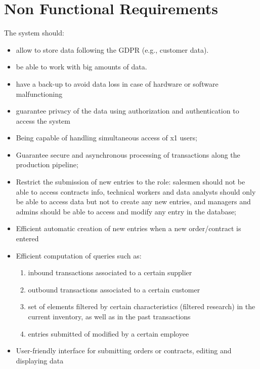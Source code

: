 \section{Non Functional Requirements}
The system should:
\begin{itemize}
    \item allow to store data following the GDPR (e.g., customer data).
    \item be able to work with big amounts of data.
    \item have a back-up to avoid data loss in case of hardware or software malfunctioning
    \item guarantee privacy of the data using authorization and authentication to access the system
    \item Being capable of handling simultaneous access of x1 users;
    \item Guarantee secure and asynchronous processing of transactions along the production pipeline;
    \item Restrict the submission of new entries to the role: salesmen should not be able to access contracts info, technical workers and data analysts should only be able to access data but not to create any new entries, and managers and admins should be able to access and modify any entry in the database;
    \item Efficient automatic creation of new entries when a new order/contract is entered 
    \item Efficient computation of queries such as:
    \begin{enumerate}
    \item inbound transactions associated to a certain supplier
    \item outbound transactions associated to a certain customer
   \item set of elements filtered by certain characteristics (filtered research) in the current inventory, as well as in the past transactions
   \item entries submitted of modified by a certain employee
    \end{enumerate}
    \item User-friendly interface for submitting orders or contracts, editing and displaying data
\end{itemize}

